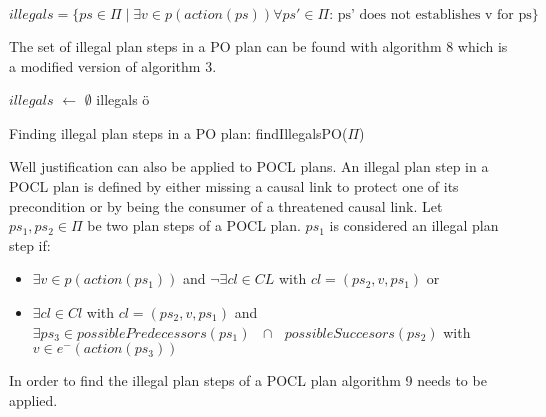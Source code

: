 $illegals = \{ps \in \Pi \mid  \exists v \in p(action(ps)) \forall ps' \in \Pi \text{: ps' does not establishes v for ps}\}$ 


The set of illegal plan steps in a PO plan can be found with algorithm 8 which is a modified version of algorithm 3.
\newpage

\begin{algorithm}[H]
    \SetAlgoLined
    $illegals$ $\leftarrow$ $\emptyset$ \;
    \Return illegals \;ö
    \caption{Finding illegal plan steps in a PO plan: findIllegalsPO($\Pi$)}
\end{algorithm}

Well justification can also be applied to POCL plans. An illegal plan step in a POCL plan is defined by either missing  
a causal link to protect one of its precondition or by being the consumer of a threatened causal link.
Let $ps_1,ps_2 \in \Pi$ be two plan steps of a POCL plan. $ps_1$ is considered an illegal plan step if:
\begin{itemize}
    \item $\exists v \in p(action(ps_1))$ and $\lnot \exists cl \in CL$ with $cl=(ps_2,v,ps_1)$ or
    \item $\exists cl \in Cl$ with $cl=(ps_2,v,ps_1)$ and $\exists ps_3 \in possiblePredecessors(ps_1)\text{ }\cap \text{ }possibleSuccesors(ps_2)$
    with $v \in e^-(action(ps_3))$
\end{itemize}


In order to find the illegal plan steps of a POCL plan algorithm 9 needs to be applied.
\newpage

